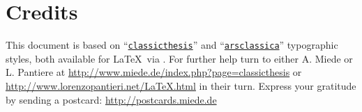 \pagestyle{empty}

\hfill

\vfill


\section*{Credits}
This document is based on  ``\href{http://www.ctan.org/tex-archive/macros/latex/contrib/classicthesis/}{\texttt{classicthesis}}'' and ``\href{http://www.ctan.org/tex-archive/macros/latex/contrib/arsclassica/}{\texttt{arsclassica}}'' typographic styles, both available for \LaTeX\ via . 
For further help turn to either A. Miede or L. Pantiere at \url{http://www.miede.de/index.php?page=classicthesis} or \url{http://www.lorenzopantieri.net/LaTeX.html} in their turn. Express your gratitude by sending a postcard: \url{http://postcards.miede.de} 



\bigskip
\begin{flushright}
\noindent{{\footnotesize [\today] } }
\end{flushright}